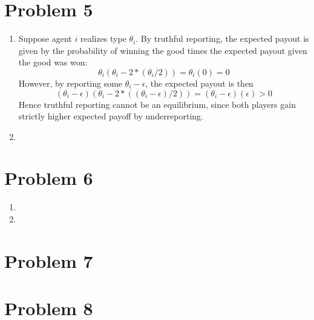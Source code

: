 \documentclass[10pt,letter]{article}
\begin{document}
\section*{Problem 5}
\begin{enumerate}[label=(\alph*)]
\item Suppose agent $i$ realizes type $\theta_i$. By truthful reporting, the expected payout is given by the probability of winning the good times the expected payout given the good was won:
\[ \theta_i \left(\theta_i - 2 * (\theta_i/2)\right) = \theta_i (0) = 0 \]
However, by reporting some $\theta_i - \epsilon$, the expected payout is then
\[ (\theta_i - \epsilon) \left(\theta_i  - 2 * ((\theta_i - \epsilon)/2)\right) = (\theta_i - \epsilon) (\epsilon) > 0 \]
Hence truthful reporting cannot be an equilibrium, since both players gain strictly higher expected payoff by underreporting.
\item
\end{enumerate}
\section*{Problem 6}
\begin{enumerate}[label=(\alph*)]
\item
\item
\end{enumerate}
\section*{Problem 7}
\section*{Problem 8}
\end{document}
